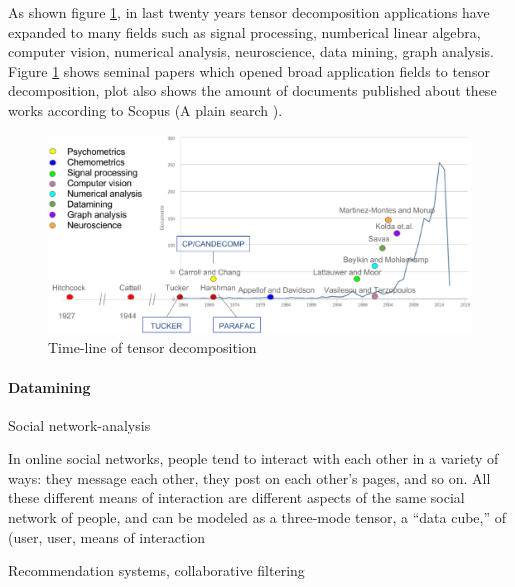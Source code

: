 \documentclass[letterpaper,12pt]{article}
\begin{document}
As shown figure \ref{fig:applications}, in last twenty years tensor decomposition applications have expanded to many fields such as signal processing, numberical linear algebra, computer vision, numerical analysis, neuroscience, data mining, graph analysis. Figure \ref{fig:applications} shows seminal papers which opened broad application fields to tensor decomposition, plot also shows the amount of documents published about these works according to Scopus (A plain search ).

\begin{figure}[!ht]
\centering
 \includegraphics[scale=0.5]{Images/time-line.eps}
 \caption{Time-line of tensor decomposition}\label{fig:applications}
\end{figure}




\paragraph{Datamining}

Social network-analysis

In online social networks, people tend to interact with each other in a variety of ways: they message each other, they post on each other’s pages, and so on. All these different means of interaction are different aspects of the same social network of people, and can be modeled as a three-mode tensor, a “data cube,” of (user, user, means of interaction \cite{Papalexakis2016}

Recommendation systems, collaborative filtering
\end{document}
